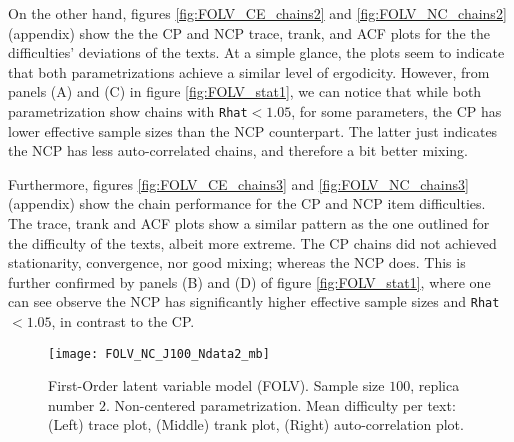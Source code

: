 On the other hand, figures \ref{fig:FOLV_CE_chains2} and \ref{fig:FOLV_NC_chains2} (appendix) show the the CP and NCP trace, trank, and ACF plots for the the difficulties' deviations of the texts. At a simple glance, the plots seem to indicate that both parametrizations achieve a similar level of ergodicity. However, from panels (A) and (C) in figure \ref{fig:FOLV_stat1}, we can notice that while both parametrization show chains with \texttt{Rhat}$<1.05$, for some parameters, the CP has lower effective sample sizes than the NCP counterpart. The latter just indicates the NCP has less auto-correlated chains, and therefore a bit better mixing.

Furthermore, figures \ref{fig:FOLV_CE_chains3} and \ref{fig:FOLV_NC_chains3} (appendix) show the chain performance for the CP and NCP item difficulties. The trace, trank and ACF plots show a similar pattern as the one outlined for the difficulty of the texts, albeit more extreme. The CP chains did not achieved stationarity, convergence, nor good mixing; whereas the NCP does. This is further confirmed by panels (B) and (D) of figure \ref{fig:FOLV_stat1}, where one can see observe the NCP has significantly higher effective sample sizes and \texttt{Rhat}$<1.05$, in contrast to the CP.
%
\begin{figure}[H]
	\centering
	\texttt{[image: FOLV\_NC\_J100\_Ndata2\_mb]}
	\caption[First-Order latent variable model (FOLV). Sample size $100$, replica number $2$. Non-centered parametrization. Mean difficulty per text. Trace, trank and auto-correlation plots.]%
	{First-Order latent variable model (FOLV). Sample size $100$, replica number $2$. Non-centered parametrization. Mean difficulty per text: (Left) trace plot, (Middle) trank plot, (Right) auto-correlation plot.}
	\label{fig:FOLV_NC_chains1}
\end{figure}

